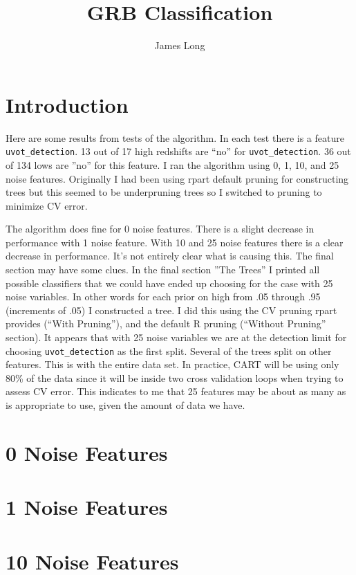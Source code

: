 \documentclass[10pt]{article}
\title{GRB Classification}
\date{}
\author{James Long}
\begin{document}
\section{Introduction}

Here are some results from tests of the algorithm. In each test there is a feature \verb|uvot_detection|.  13 out of 17 high redshifts are ``no'' for \verb|uvot_detection|.  36 out of 134 lows are ''no'' for this feature. I ran the algorithm using 0, 1, 10, and 25 noise features. Originally I had been using rpart default pruning for constructing trees but this seemed to be underpruning trees so I switched to pruning to minimize CV error.

The algorithm does fine for 0 noise features. There is a slight decrease in performance with 1 noise feature. With 10 and 25 noise features there is a clear decrease in performance. It's not entirely clear what is causing this. The final section may have some clues. In the final section ''The Trees'' I printed all possible classifiers that we could have ended up choosing for the case with 25 noise variables. In other words for each prior on high from .05 through .95 (increments of .05) I constructed a tree. I did this using the CV pruning rpart provides (``With Pruning''), and the default R pruning (``Without Pruning'' section). It appears that with 25 noise variables we are at the detection limit for choosing \verb|uvot_detection| as the first split. Several of the trees split on other features. This is with the entire data set. In practice, CART will be using only 80\% of the data since it will be inside two cross validation loops when trying to assess CV error. This indicates to me that 25 features may be about as many as is appropriate to use, given the amount of data we have.


\section{0 Noise Features}





\section{1 Noise Features}




\section{10 Noise Features}
\end{document}
